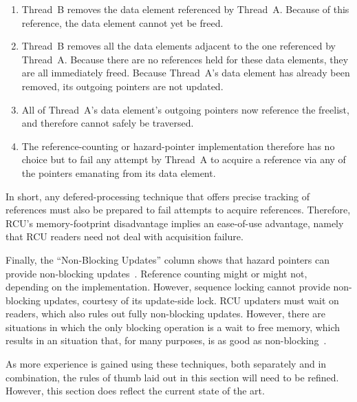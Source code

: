 \begin{enumerate}
\item	Thread~B removes the data element referenced by Thread~A.
	Because of this reference, the data element cannot yet be freed.
\item	Thread~B removes all the data elements adjacent to the one
	referenced by Thread~A.
	Because there are no references held for these data elements,
	they are all immediately freed.
	Because Thread~A's data element has already been removed,
	its outgoing pointers are not updated.
\item	All of Thread~A's data element's outgoing pointers now reference
	the freelist, and therefore cannot safely be traversed.
\item	The reference-counting or hazard-pointer implementation therefore
	has no choice but to fail any attempt by Thread~A to acquire
	a reference via any of the pointers emanating from its data
	element.
\end{enumerate}

In short, any defered-processing technique that offers precise tracking
of references must also be prepared to fail attempts to acquire references.
Therefore, RCU's memory-footprint disadvantage implies an ease-of-use
advantage, namely that RCU readers need not deal with acquisition failure.

Finally, the ``Non-Blocking Updates'' column shows that hazard pointers
can provide non-blocking updates~\cite{MagedMichael04a,HerlihyLM02}.
Reference counting might or might not, depending on the implementation.
However, sequence locking cannot provide non-blocking updates, courtesy
of its update-side lock.
RCU updaters must wait on readers, which also rules out fully non-blocking
updates.
However, there are situations in which the only blocking operation is
a wait to free memory, which results in an situation that, for many
purposes, is as good as non-blocking~\cite{MathieuDesnoyers2012URCU}.

As more experience is gained using these techniques, both separately
and in combination, the rules of thumb laid out in this section will
need to be refined.
However, this section does reflect the current state of the art.
